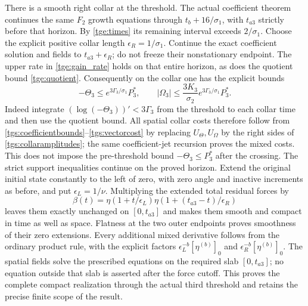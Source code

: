 There is a smooth right collar at the threshold. The actual
coefficient theorem continues the same $F_2$ growth equations
through $t_b+16/\sigma_1$, with $t_{a3}$ strictly before that
horizon. By \eqref{tge:times} its remaining interval exceeds
$2/\sigma_1$. Choose the explicit positive collar length
$\epsilon_R=1/\sigma_1$.
Continue the exact coefficient solution and fields to
$t_{a3}+\epsilon_R$; do not freeze their nonstationary endpoint.
The upper rate in \eqref{tge:gain_rate} holds on that entire
horizon, as does the quotient bound \eqref{tge:quotient}.
Consequently on the collar one has the explicit bounds
\begin{equation}\label{tgs:collaramplitudes}
 -\Theta_3\leq e^{3\Gamma_3/\sigma_1}P_3^*,\qquad
 |\Omega_3|\leq
       \frac{3K_3}{\sigma_2}e^{3\Gamma_3/\sigma_1}P_3^*.
\end{equation}
Indeed integrate $(\log(-\Theta_3))'<3\Gamma_3$ from the
threshold to each collar time and then use the quotient bound.
All spatial collar costs therefore follow from
\eqref{tgs:coefficientbounds}--\eqref{tgs:vectorcost} by replacing
$U_\Theta,U_\Omega$ by the right sides of
\eqref{tgs:collaramplitudes}; the same coefficient-jet recursion
proves the mixed costs. This does not impose the pre-threshold
bound $-\Theta_3\leq P_3^*$ after the crossing.
The strict support inequalities continue on the proved horizon.
Extend the original initial state constantly to the left of zero,
with zero angle and inactive increments as before, and put
$\epsilon_L=1/\nu$.
Multiplying the extended total residual forces by
\begin{equation}\label{tgs:timecutoff}
 \beta(t)=\eta(1+t/\epsilon_L)
                  \eta(1+(t_{a3}-t)/\epsilon_R)
\end{equation}
leaves them exactly unchanged on $[0,t_{a3}]$ and makes them
smooth and compact in time as well as space. Flatness at the two
outer endpoints proves smoothness of their zero extensions.
Every additional mixed derivative follows from the ordinary
product rule, with the explicit factors
$\epsilon_L^{-b}[\eta^{(b)}]_0$ and
$\epsilon_R^{-b}[\eta^{(b)}]_0$.
The spatial fields solve the prescribed equations on the required
slab $[0,t_{a3}]$; no equation outside that slab is asserted after
the force cutoff. This proves the complete compact realization
through the actual third threshold and retains the precise finite
scope of the result.
